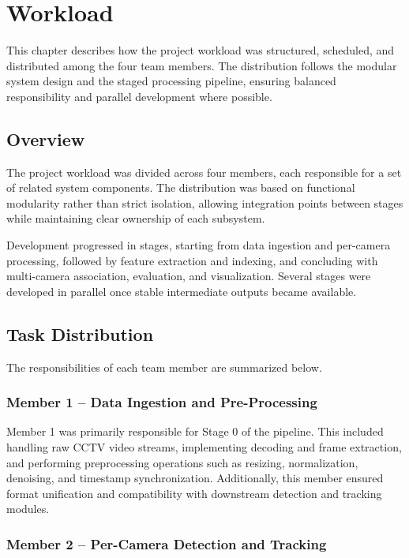 \chapter{Workload}

This chapter describes how the project workload was structured, scheduled, and distributed among the four team members. The distribution follows the modular system design and the staged processing pipeline, ensuring balanced responsibility and parallel development where possible.

\section{Overview}

The project workload was divided across four members, each responsible for a set of related system components. The distribution was based on functional modularity rather than strict isolation, allowing integration points between stages while maintaining clear ownership of each subsystem.

Development progressed in stages, starting from data ingestion and per-camera processing, followed by feature extraction and indexing, and concluding with multi-camera association, evaluation, and visualization. Several stages were developed in parallel once stable intermediate outputs became available.

\section{Task Distribution}

The responsibilities of each team member are summarized below.

\subsection*{Member 1 – Data Ingestion and Pre-Processing}

Member 1 was primarily responsible for Stage 0 of the pipeline. This included handling raw CCTV video streams, implementing decoding and frame extraction, and performing preprocessing operations such as resizing, normalization, denoising, and timestamp synchronization. Additionally, this member ensured format unification and compatibility with downstream detection and tracking modules.

\subsection*{Member 2 – Per-Camera Detection and Tracking}

